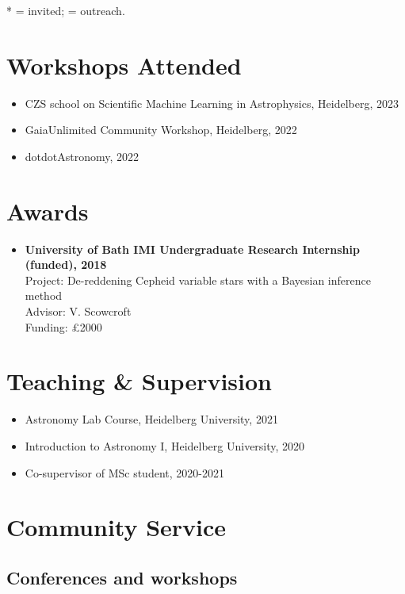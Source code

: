 \documentclass[12pt, letterpaper]{hunt-cv}
\begin{document}
* = invited; \cross = outreach.

\section*{Workshops Attended}

\begin{itemize}
    \item CZS school on Scientific Machine Learning in Astrophysics, Heidelberg, 2023
    \item GaiaUnlimited Community Workshop, Heidelberg, 2022
    \item dotdotAstronomy, 2022
\end{itemize}


\section*{Awards}

\begin{itemize}
    \item \textbf{University of Bath IMI Undergraduate Research Internship (funded), 2018}\\
    Project: De-reddening Cepheid variable stars with a Bayesian inference method\\
    Advisor: V. Scowcroft\\
    Funding: £2000
\end{itemize}


\section*{Teaching \& Supervision}

\begin{itemize}
    \item Astronomy Lab Course, Heidelberg University, 2021
    \item Introduction to Astronomy I, Heidelberg University, 2020
    \item Co-supervisor of MSc student, 2020-2021
\end{itemize}


\section*{Community Service}

\subsection*{Conferences and workshops}
\end{document}
